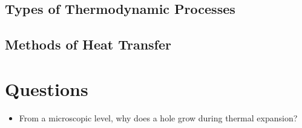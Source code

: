 \documentclass{report}
\begin{document}
\section{Types of Thermodynamic Processes}
\section{Methods of Heat Transfer}




\chapter{Questions}
\begin{itemize}
    \item From a microscopic level, why does a hole grow during thermal expansion?
\end{itemize}

\newpage
\end{document}
